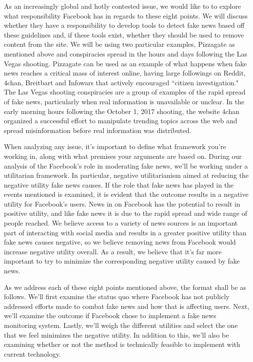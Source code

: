 \documentclass[12pt]{article}
\begin{document}
As an increasingly global and hotly contested issue, we would like to to explore what responsibility Facebook has in regards to these eight points. We will discuss whether they have a responsibility to develop tools to detect fake news based off these guidelines and, if these tools exist, whether they should be used to remove content from the site. We will be using two particular examples, Pizzagate as mentioned above and conspiracies spread in the hours and days following the Las Vegas shooting. Pizzagate can be used as an example of what happens when fake news reaches a critical mass of interest online, having large followings on Reddit, 4chan, Breitbart and Infowars that actively encouraged ``citizen investigation." The Las Vegas shooting conspiracies are a group of examples of the rapid spread of fake news, particularly when real information is unavailable or unclear. In the early morning hours following the October 1, 2017 shooting, the website 4chan organized a successful effort to manipulate trending topics across the web and spread misinformation before real information was distributed.

When analyzing any issue, it's important to define what framework you're working in, along with what premises your arguments are based on. During our analysis of the Facebook's role in moderating fake news, we'll be working under a utilitarian framework. In particular, negative utilitarianism aimed at reducing the negative utility fake news causes. If the role that fake news has played in the events mentioned is examined, it is evident that the outcome results in a negative utility for Facebook's users. News in on Facebook has the potential to result in positive utility, and like fake news it is due to the rapid spread and wide range of people reached. We believe access to a variety of news sources is an important part of interacting with social media and results in a greater positive utility than fake news causes negative, so we believe removing news from Facebook would increase negative utility overall. As a result, we believe that it's far more important to try to minimize the corresponding negative utility caused by fake news.

As we address each of these eight points mentioned above, the format shall be as follows. We'll first examine the status quo where Facebook has not publicly addressed efforts made to combat fake news and how that is affecting users. Next, we'll examine the outcome if Facebook chose to implement a fake news monitoring system. Lastly, we'll weigh the different utilities and select the one that we feel minimizes the negative utility. In addition to this, we'll also be examining whether or not the method is technically feasible to implement with current technology.
\end{document}
